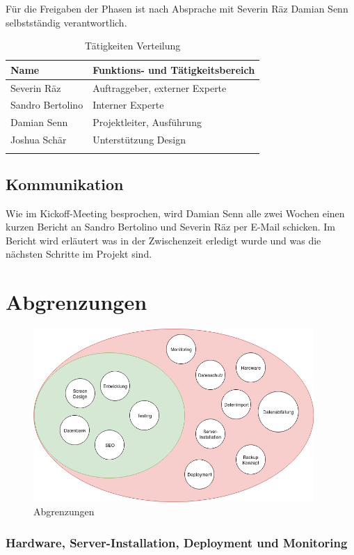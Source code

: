 Für die Freigaben der Phasen ist nach Absprache mit Severin Räz Damian Senn
selbstständig verantwortlich.

\begin{longtable}[]{@{}ll@{}}
  \toprule
  \textbf{Name}    & \textbf{Funktions- und Tätigkeitsbereich}\tabularnewline
  \midrule
  \endhead
  Severin Räz      & Auftraggeber, externer Experte\tabularnewline
  Sandro Bertolino & Interner Experte\tabularnewline
  Damian Senn      & Projektleiter, Ausführung\tabularnewline
  Joshua Schär     & Unterstützung Design\tabularnewline
  \bottomrule
  \caption{Tätigkeiten Verteilung}
\end{longtable}

\subsection{Kommunikation}\label{kommunikation}

Wie im Kickoff-Meeting besprochen, wird Damian Senn alle zwei Wochen einen
kurzen Bericht an Sandro Bertolino und Severin Räz per E-Mail schicken.
Im Bericht wird erläutert was in der Zwischenzeit erledigt wurde und was
die nächsten Schritte im Projekt sind.

\clearpage

\section{Abgrenzungen}\label{abgrenzungen}

\begin{figure}[!htb]
  \centering
  \includegraphics[width=0.95\textwidth]{figures/abgrenzungen.png}
  \caption{Abgrenzungen}
\end{figure}

\subsubsection{Hardware, Server-Installation, Deployment und
  Monitoring}\label{hardware-server-installation-deployment-und-monitoring}

